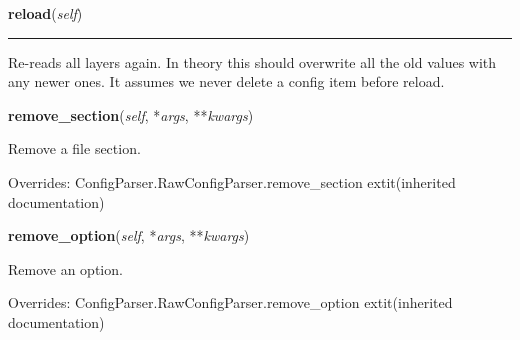     \label{util:LayerConfigParser:reload}

    \vspace{0.5ex}

\hspace{.8\funcindent}\begin{boxedminipage}{\funcwidth}

    \raggedright \textbf{reload}(\textit{self})

    \vspace{-1.5ex}

    \rule{\textwidth}{0.5\fboxrule}
\setlength{\parskip}{2ex}
    Re-reads all layers again. In theory this should overwrite all the old 
    values with any newer ones. It assumes we never delete a config item 
    before reload.

\setlength{\parskip}{1ex}
    \end{boxedminipage}

    \vspace{0.5ex}

\hspace{.8\funcindent}\begin{boxedminipage}{\funcwidth}

    \raggedright \textbf{remove\_section}(\textit{self}, *\textit{args}, **\textit{kwargs})

\setlength{\parskip}{2ex}
    Remove a file section.

\setlength{\parskip}{1ex}
      Overrides: ConfigParser.RawConfigParser.remove\_section 	extit{(inherited documentation)}

    \end{boxedminipage}

    \vspace{0.5ex}

\hspace{.8\funcindent}\begin{boxedminipage}{\funcwidth}

    \raggedright \textbf{remove\_option}(\textit{self}, *\textit{args}, **\textit{kwargs})

\setlength{\parskip}{2ex}
    Remove an option.

\setlength{\parskip}{1ex}
      Overrides: ConfigParser.RawConfigParser.remove\_option 	extit{(inherited documentation)}

    \end{boxedminipage}

